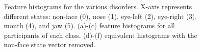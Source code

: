 \documentclass[10pt,twocolumn,letterpaper]{article}
\begin{document}
\begin{figure}%
               \hfill   
               \hfill
               \hfill   
               \hfill
            
\caption{Feature histograms for the various disorders. X-axis represents different states: non-face (0), nose (1), eye-left (2), eye-right (3), mouth (4), and jaw (5). (a)-(c) feature histograms for all participants of each class. (d)-(f) equivalent histograms with the non-face state vector removed.}
\label{fig:histo}
\end{figure}
\end{document}
